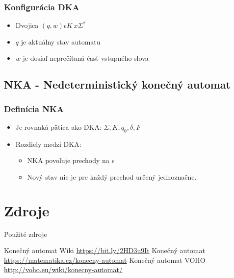 \documentclass[10pt, hyperref={unicode}]{beamer}
\begin{document}
\begin{frame}
\transblindsvertical
\frametitle{Konfigurácia DKA}
\begin{itemize}
\item Dvojica ${(q,w)\epsilon K~x \Sigma^*}$
\item $q$ je aktuálny stav automatu
\item $w$ je dosiaľ neprečítaná časť vstupného slova
\end{itemize}
\end{frame}

\subsection{NKA - Nedeterministický konečný automat}
\begin{frame}
\transblindsvertical
\frametitle{Definícia NKA}
\begin{itemize}
\item Je rovnaká pätica ako DKA: ${\Sigma,K,q_0,\delta,F}$
\item Rozdiely medzi DKA:
\begin{itemize}
\item NKA povoľuje prechody na $\epsilon$
\item Nový stav nie je pre každý prechod určený jednoznačne.
\end{itemize}
\end{itemize}
\end{frame}

\section*{Zdroje}
\begin{frame}{Použité zdroje}
\transblindsvertical
	\begin{thebibliography}{1}
		 Konečný automat Wiki
		\newblock \url{https://bit.ly/2HD3u9It}
		 Konečný automat
		\newblock \url{https://matematika.cz/konecny-automat}
		 Konečný automat VOHO
		\newblock \url{http://voho.eu/wiki/konecny-automat/}
	\end{thebibliography}
\end{frame}
\end{document}
